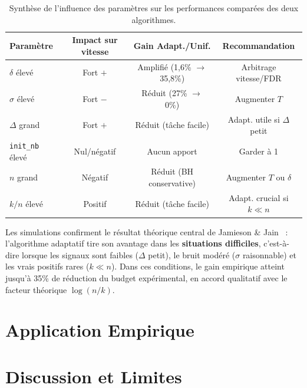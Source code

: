 \documentclass[11pt,a4paper]{article}
\begin{document}
\begin{table}[H]
\centering
\renewcommand{\arraystretch}{1.3}
\begin{tabular}{lccc}
\hline
\textbf{Paramètre} & \textbf{Impact sur vitesse}
  & \textbf{Gain Adapt./Unif.} & \textbf{Recommandation} \\
\hline
$\delta$ élevé    & Fort $+$ & Amplifié (1,6\% $\to$ 35,8\%)
                  & Arbitrage vitesse/FDR \\
$\sigma$ élevé    & Fort $-$ & Réduit (27\% $\to$ 0\%)
                  & Augmenter $T$ \\
$\Delta$ grand    & Fort $+$ & Réduit (tâche facile)
                  & Adapt. utile si $\Delta$ petit \\
\texttt{init\_nb} élevé & Nul/négatif & Aucun apport
                  & Garder à 1 \\
$n$ grand         & Négatif  & Réduit (BH conservative)
                  & Augmenter $T$ ou $\delta$ \\
$k/n$ élevé       & Positif  & Réduit (tâche facile)
                  & Adapt. crucial si $k \ll n$ \\
\hline
\end{tabular}
\caption{Synthèse de l'influence des paramètres sur les performances
         comparées des deux algorithmes.}
\label{tab:synthese}
\end{table}

Les simulations confirment le résultat théorique central de
Jamieson \& Jain~\cite{jamieson2019} : l'algorithme adaptatif
tire son avantage dans les \textbf{situations difficiles}, c'est-à-dire
lorsque les signaux sont faibles ($\Delta$ petit), le bruit modéré
($\sigma$ raisonnable) et les vrais positifs rares ($k \ll n$). Dans
ces conditions, le gain empirique atteint jusqu'à 35\% de réduction du
budget expérimental, en accord qualitatif avec le facteur théorique
$\log(n/k)$.

\section{Application Empirique}
\label{sec:empirique}


\section{Discussion et Limites}
\label{sec:discussion}
\end{document}
